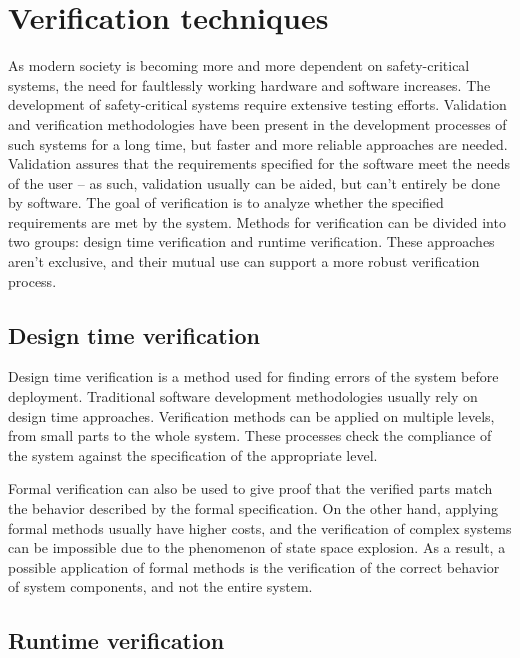 \section{Verification techniques} 

As modern society is becoming more and more dependent on safety-critical systems, the need for faultlessly working hardware and software increases. The development of safety-critical systems require extensive testing efforts. Validation and verification methodologies have been present in the development processes of such systems for a long time\citep{ieee1012}, but faster and more reliable approaches are needed. Validation assures that the requirements specified for the software meet the needs of the user -- as such, validation usually can be aided, but can’t entirely be done by software. The goal of verification is to analyze whether the specified requirements are met by the system. Methods for verification can be divided into two groups: design time verification and runtime verification. These approaches aren't exclusive, and their mutual use can support a more robust verification process.

\subsection{Design time verification}

Design time verification is a method used for finding errors of the system before deployment. Traditional software development methodologies usually rely on design time approaches. Verification methods can be applied on multiple levels, from small parts to the whole system. These processes check the compliance of the system against the specification of the appropriate level.%

Formal verification can also be used to give proof that the verified parts match the behavior described by the formal specification. On the other hand, applying formal methods usually have higher costs, and the verification of complex systems can be impossible due to the phenomenon of state space explosion. As a result, a possible application of formal methods is the verification of the correct behavior of system components, and not the entire system.

\subsection{Runtime verification}

